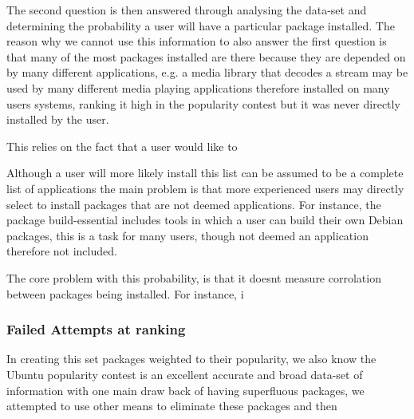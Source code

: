 The second question is then answered through analysing the data-set and determining the probability a user will have a particular package installed.
The reason why we cannot use this information to also answer the first question is that many of the most packages installed are there because they are depended on by many different applications,
e.g. a media library that decodes a stream may be used by many different media playing applications therefore installed on many users systems, 
ranking it high in the popularity contest but it was never directly installed by the user.


This relies on the fact that a user would like to 

Although a user will more likely install this list can be assumed to be a complete list of applications 
the main problem is that more experienced users may directly select to install packages that are not deemed applications.
For instance, the package build-essential includes tools in which a user can build their own Debian packages,
this is a task for many users, though not deemed an application therefore not included.

The core problem with this probability, is that it doesnt measure corrolation between packages being installed.
For instance, i


\subsubsection{Failed Attempts at ranking}
In creating this set packages weighted to their popularity, we also  know the Ubuntu popularity contest is an excellent accurate and broad data-set of information with one main draw back of having superfluous packages,
we attempted to use other means to eliminate these packages and then  

